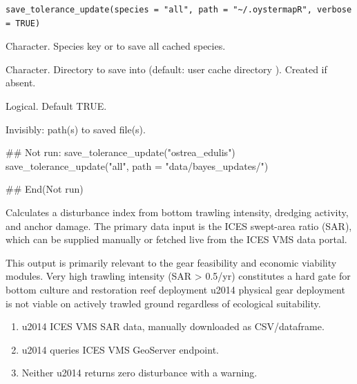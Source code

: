 \documentclass[a4paper]{book}
\begin{document}
%
\begin{Usage}
\begin{verbatim}
save_tolerance_update(species = "all", path = "~/.oystermapR", verbose = TRUE)
\end{verbatim}
\end{Usage}
%
\begin{Arguments}
\begin{ldescription}
\item[\code{species}] Character. Species key or  to save all cached species.

\item[\code{path}] Character. Directory to save into (default: user cache directory
). Created if absent.

\item[\code{verbose}] Logical. Default TRUE.
\end{ldescription}
\end{Arguments}
%
\begin{Value}
Invisibly: path(s) to saved file(s).
\end{Value}
%
\begin{Examples}
\begin{ExampleCode}
## Not run: 
save_tolerance_update("ostrea_edulis")
save_tolerance_update("all", path = "data/bayes_updates/")

## End(Not run)
\end{ExampleCode}
\end{Examples}
%
\begin{Description}
Calculates a disturbance index  from bottom trawling intensity,
dredging activity, and anchor damage. The primary data input is the
ICES swept-area ratio (SAR), which can be supplied manually or fetched
live from the ICES VMS data portal.

This output is primarily relevant to the gear feasibility and economic
viability modules. Very high trawling intensity (SAR > 0.5/yr) constitutes
a hard gate for bottom culture and restoration reef deployment \bsl{}u2014 physical
gear deployment is not viable on actively trawled ground regardless of
ecological suitability.

\begin{enumerate}

\item{}  \bsl{}u2014 ICES VMS SAR data, manually downloaded as CSV/dataframe.
\item{}  \bsl{}u2014 queries ICES VMS GeoServer endpoint.
\item{} Neither \bsl{}u2014 returns zero disturbance with a warning.

\end{enumerate}

\end{Description}
\end{document}
